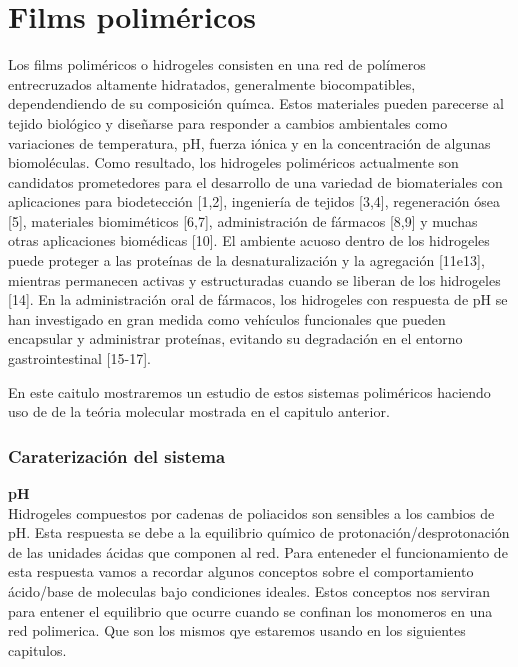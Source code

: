 
\chapter{Films polim\'ericos} %

\label{Chapter2} %



Los films polim\'ericos o hidrogeles  consisten en una red de pol\'imeros entrecruzados altamente hidratados, generalmente biocompatibles, dependendiendo de su composici\'on qu\'imca. Estos materiales pueden parecerse al tejido biol\'ogico y dise\~narse para responder a cambios ambientales como variaciones de temperatura, pH, fuerza i\'onica y en la concentraci\'on de algunas biomol\'eculas. Como resultado, los hidrogeles polim\'ericos actualmente son candidatos prometedores para el desarrollo de una variedad de biomateriales con aplicaciones para biodetección [1,2], ingenier\'ia de tejidos [3,4], regeneraci\'on \'osea [5], materiales biomim\'eticos [6,7], administraci\'on de f\'armacos [8,9] y muchas otras aplicaciones biom\'edicas [10]. El ambiente acuoso dentro de los hidrogeles puede proteger a las prote\'inas de la desnaturalización y la agregaci\'on [11e13], mientras permanecen activas y estructuradas cuando se liberan de los hidrogeles [14]. En la administraci\'on oral de f\'armacos, los hidrogeles con respuesta de pH se han investigado en gran medida como veh\'iculos funcionales que pueden encapsular y administrar prote\'inas, evitando su degradaci\'on en el entorno gastrointestinal [15-17].


En este caitulo mostraremos un estudio  de estos sistemas polim\'ericos haciendo uso de de la te\'oria molecular mostrada en el capitulo anterior. 



\subsection{Caraterizaci\'on del sistema}
\textbf{pH} \\
Hidrogeles  compuestos por cadenas de poliacidos son sensibles a los cambios de pH. Esta respuesta se debe a la equilibrio qu\'imico de protonaci\'on/desprotonaci\'on de las unidades \'acidas que componen al red. 
Para enteneder el funcionamiento de esta respuesta vamos a recordar algunos conceptos sobre el comportamiento \'acido/base de moleculas bajo condiciones ideales. 
Estos conceptos nos serviran para entener el equilibrio que ocurre cuando se confinan los monomeros en una red polimerica. Que son los mismos qye estaremos usando en los siguientes capitulos.

